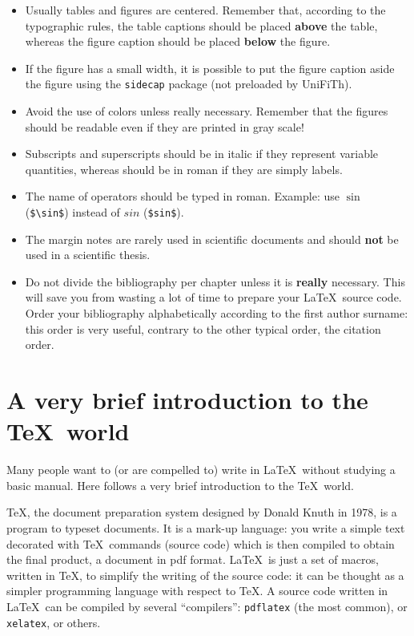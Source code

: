 \documentclass[a5paper,11pt]{article}
\newcommand{\bs}{\textbackslash}
\begin{document}
\begin{itemize}
\item Usually tables and figures are centered. Remember that, according to the typographic rules, the table captions should be placed \textbf{above} the table, whereas the figure caption should be placed \textbf{below} the figure.

\item If the figure has a small width, it is possible to put the figure caption
aside the figure using the \texttt{sidecap} package (not preloaded by \textsf{UniFiTh}).

\item Avoid the use of colors unless really necessary. Remember that the figures should be readable even if they are printed in gray scale!

\item Subscripts and superscripts should be in italic if they represent variable quantities, whereas should be in roman if they are simply labels.

\item The name of operators should be typed in roman. Example: use $\sin$ (\texttt{\$\bs sin\$}) instead of $sin$ (\texttt{\$sin\$}).

\item The margin notes are rarely used in scientific documents and should \textbf{not} be used in a scientific thesis.

\item Do not divide the bibliography per chapter unless it is \textbf{really} necessary.
This will save you from wasting a lot of time to prepare your \LaTeX\ source code.
Order your bibliography alphabetically according to the
first author surname: this order is very useful, contrary to the other typical order, the citation order.

\end{itemize}


\appendix

\section{A very brief introduction to the \TeX\ world}

Many people want to (or are compelled to) write in \LaTeX\ without studying
a basic manual. Here follows a very brief introduction to the \TeX\ world.

\TeX, the document preparation system designed by Donald Knuth in 1978, is a program to typeset documents.
It is a mark-up language: you write a simple text decorated with \TeX\ commands (source code) which is then compiled to obtain the final product, a document in pdf format. 
\LaTeX\ is just a set of macros, written in \TeX, to simplify the writing of the source code: it can be thought as a simpler programming language with respect to \TeX. A source code written in \LaTeX\ can be compiled by several ``compilers'': \texttt{pdflatex} (the most common), or \texttt{xelatex}, or others.
\end{document}
